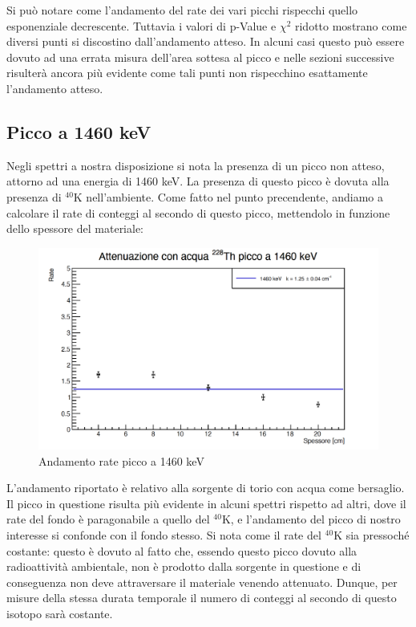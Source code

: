 \documentclass[a4paper,10pt]{article}
\begin{document}
\noindent Si pu\`o notare come l'andamento del rate dei vari picchi rispecchi quello esponenziale decrescente. Tuttavia i valori di p-Value e $\chi^2$ ridotto mostrano come diversi punti si discostino dall'andamento atteso. In alcuni casi questo pu\`o essere dovuto ad una errata misura dell'area sottesa al picco e nelle sezioni successive risulter\`a ancora pi\`u evidente come tali punti non rispecchino esattamente l'andamento atteso.

\subsection{Picco a 1460 keV}

\noindent Negli spettri a nostra disposizione si nota la presenza di un picco non atteso, attorno ad una energia di 1460 keV. La presenza di questo picco \`e dovuta alla presenza di ${}^{40}$K nell'ambiente. Come fatto nel punto precendente, andiamo a calcolare il rate di conteggi al secondo di questo picco, mettendolo in funzione dello spessore del materiale:

\begin{figure}[H]
    \centering
    \includegraphics[scale=0.45]{grafici/1460keV}
    \caption{Andamento rate picco a 1460 keV}
\end{figure}

\noindent L'andamento riportato \`e relativo alla sorgente di torio con acqua come bersaglio. Il picco in questione risulta pi\`u evidente in alcuni spettri rispetto ad altri, dove il rate del fondo \`e paragonabile a quello del ${}^{40}$K, e l'andamento del picco di nostro interesse si confonde con il fondo stesso. Si nota come il rate del ${}^{40}$K sia pressoch\'e costante: questo \`e dovuto al fatto che, essendo questo picco dovuto alla radioattivit\`a ambientale, non \`e prodotto dalla sorgente in questione e di conseguenza non deve attraversare il materiale venendo attenuato. Dunque, per misure della stessa durata temporale il numero di conteggi al secondo di questo isotopo sar\`a costante.
\end{document}

